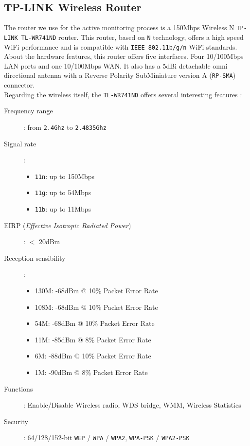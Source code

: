 \subsection{TP-LINK Wireless Router}
The router we use for the active monitoring process is a 150Mbps Wireless N \texttt{TP-LINK TL-WR741ND} router. This router, based on \texttt{N} technology, offers a high speed WiFi performance and is compatible with \texttt{IEEE 802.11b/g/n} WiFi standards. \\
About the hardware features, this router offers five interfaces. Four 10/100Mbps LAN ports and one 10/100Mbps WAN. It also has a 5dBi detachable omni directional antenna with a Reverse Polarity SubMiniature version A (\texttt{RP-SMA}) connector.\\
Regarding the wireless itself, the \texttt{TL-WR741ND} offers several interesting features \cite{tplink}:

\begin{description}
	\item [Frequency range]: from \texttt{2.4Ghz} to \texttt{2.4835Ghz}
	\item [Signal rate]:
		\begin{itemize}
			\item \texttt{11n}: up to 150Mbps
			\item \texttt{11g}: up to 54Mbps
			\item \texttt{11b}: up to 11Mbps
		\end{itemize}
	\item [EIRP (\textit{Effective Isotropic Radiated Power})]: $<$ 20dBm 
	\item [Reception sensibility]:
		\begin{itemize}
			\item 130M: -68dBm @ 10\% Packet Error Rate
			\item 108M: -68dBm @ 10\% Packet Error Rate
			\item 54M: -68dBm @ 10\% Packet Error Rate
			\item 11M: -85dBm @ 8\% Packet Error Rate
			\item 6M: -88dBm @ 10\% Packet Error Rate
			\item 1M: -90dBm @ 8\% Packet Error Rate
		\end{itemize}
	\item [Functions]: Enable/Disable Wireless radio, WDS bridge, WMM, Wireless Statistics
	\item [Security]: 64/128/152-bit \texttt{WEP} / \texttt{WPA} / \texttt{WPA2}, \texttt{WPA-PSK} / \texttt{WPA2-PSK}
\end{description}


